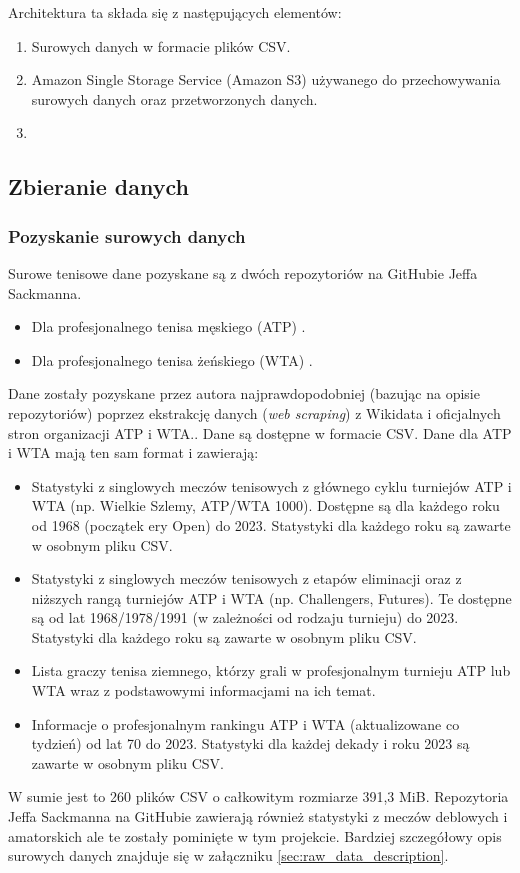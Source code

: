 \documentclass[12pt, a4paper]{article}
\begin{document}
Architektura ta składa się z następujących elementów:
\begin{enumerate}
    \item Surowych danych w formacie plików CSV.
    \item Amazon Single Storage Service (Amazon S3) używanego do przechowywania surowych danych oraz przetworzonych danych.
    \item 
\end{enumerate}


\subsection{Zbieranie danych}
\subsubsection{Pozyskanie surowych danych}
Surowe tenisowe dane pozyskane są z dwóch repozytoriów na GitHubie Jeffa Sackmanna.
\begin{itemize}
    \item Dla profesjonalnego tenisa męskiego (ATP) \cite{tennis_atp}.
    \item Dla profesjonalnego tenisa żeńskiego (WTA) \cite{tennis_wta}.
\end{itemize}
Dane zostały pozyskane przez autora najprawdopodobniej (bazując na opisie repozytoriów) poprzez ekstrakcję danych (\textit{web scraping}) z Wikidata i oficjalnych stron organizacji ATP i WTA..
Dane są dostępne w formacie CSV. Dane dla ATP i WTA mają ten sam format i zawierają:
\begin{itemize}
    \item Statystyki z singlowych meczów tenisowych z głównego cyklu turniejów ATP i WTA (np. Wielkie Szlemy, ATP/WTA 1000). Dostępne są dla każdego roku od 1968 (początek ery Open) do 2023. Statystyki dla każdego roku są zawarte w osobnym pliku CSV.
    \item Statystyki z singlowych meczów tenisowych z etapów eliminacji oraz z niższych rangą turniejów ATP i WTA (np. Challengers, Futures). Te dostępne są od lat 1968/1978/1991 (w zależności od rodzaju turnieju) do 2023. Statystyki dla każdego roku są zawarte w osobnym pliku CSV.
    \item Lista graczy tenisa ziemnego, którzy grali w profesjonalnym turnieju ATP lub WTA wraz z podstawowymi informacjami na ich temat.
    \item Informacje o profesjonalnym rankingu ATP i WTA (aktualizowane co tydzień) od lat 70 do 2023. Statystyki dla każdej dekady i roku 2023 są zawarte w osobnym pliku CSV.
\end{itemize}
W sumie jest to 260 plików CSV o całkowitym rozmiarze 391,3 MiB. Repozytoria Jeffa Sackmanna na GitHubie zawierają również statystyki z meczów deblowych i amatorskich ale te zostały pominięte w tym projekcie. Bardziej szczegółowy opis surowych danych znajduje się w załączniku \ref{sec:raw_data_description}.
\end{document}
